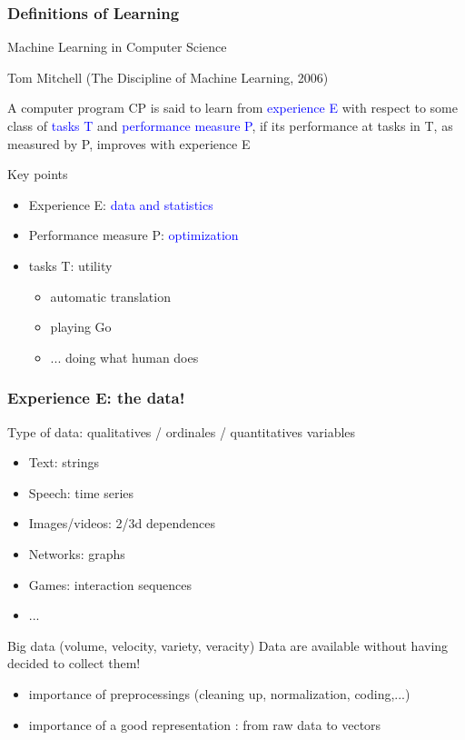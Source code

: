 \documentclass[pressentation,9pt,aspectratio=1610,xcolor=table]{beamer}
\renewenvironment{description}{\begin{itemize}}{\end{itemize}}
\newcommand{\structuretext}[1]{{\textcolor{blue}{#1}}}
\begin{document}
\begin{frame}
  \frametitle{Definitions of Learning}

  \begin{block}{Machine Learning in Computer Science}

    Tom Mitchell (The Discipline of Machine Learning, 2006)
    \medskip

    A computer program CP is said to learn from \structuretext{experience E} with respect to
    some class of \structuretext{tasks T} and \structuretext{performance measure P}, if its performance at
    tasks in T, as measured by P, improves with experience E
  \end{block}


  \begin{block}{Key points}
    \begin{itemize}
    \item<2-> Experience E:  \structuretext{data and statistics}
    \item<3-> Performance measure P: \structuretext{optimization}
    \item<4-> tasks T: utility
      \begin{itemize}
      \item automatic translation
      \item playing Go
      \item ... doing what human does
      \end{itemize}
    \end{itemize}

  \end{block}
\end{frame}

\begin{frame}
  \frametitle{Experience E: the data!}

  \begin{block}{Type of data:  qualitatives / ordinales / quantitatives variables}
    \begin{description}
    \item Text:  strings
    \item Speech: time series
    \item Images/videos: 2/3d dependences
    \item Networks: graphs
    \item Games: interaction sequences
    \item ...
    \end{description}
  \end{block}

  \begin{block}{Big data (volume, velocity, variety, veracity)}
    Data are available without having decided to collect them!
    \begin{itemize}
    \item importance of preprocessings (cleaning up, normalization, coding,...)
    \item importance of a good representation : from raw data to vectors
    \end{itemize}
  \end{block}
\end{frame}
\end{document}
